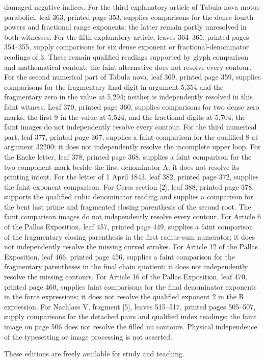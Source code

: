 damaged negative indices. For the third explanatory article of Tabula nova motus parabolici, leaf 363, printed page 353, supplies comparisons for the dense fourth powers and fractional range exponents; the latter remain partly unresolved in both witnesses. For the fifth explanatory article, leaves 364–365, printed pages 354–355, supply comparisons for six dense exponent or fractional-denominator readings of 3. These remain qualified readings supported by glyph comparison and mathematical context; the faint alternative does not resolve every contour. For the second numerical part of Tabula nova, leaf 369, printed page 359, supplies comparisons for the fragmentary final digit in argument 5,354 and the fragmentary zero in the value at 5,294; neither is independently resolved in this faint witness. Leaf 370, printed page 360, supplies comparisons for two dense zero marks, the first 9 in the value at 5,524, and the fractional digits at 5,704; the faint images do not independently resolve every contour. For the third numerical part, leaf 377, printed page 367, supplies a faint comparison for the qualified 8 at argument 32200; it does not independently resolve the incomplete upper loop. For the Encke letter, leaf 378, printed page 368, supplies a faint comparison for the two-component mark beside the first denominator A; it does not resolve its printing intent. For the letter of 1 April 1843, leaf 382, printed page 372, supplies the faint exponent comparison. For Ceres section [2], leaf 388, printed page 378, supports the qualified cubic denominator reading and supplies a comparison for the bent last prime and fragmented closing parenthesis of the second root. The faint comparison images do not independently resolve every contour. For Article 6 of the Pallas Exposition, leaf 457, printed page 449, supplies a faint comparison of the fragmentary closing parenthesis in the first radius-sum numerator; it does not independently resolve the missing curved strokes. For Article 12 of the Pallas Exposition, leaf 466, printed page 456, supplies a faint comparison for the fragmentary parentheses in the final chain quotient; it does not independently resolve the missing contours. For Article 16 of the Pallas Exposition, leaf 470, printed page 460, supplies faint comparisons for the final denominator exponents in the force expressions; it does not resolve the qualified exponent 2 in the R expression. For Nachlass V, fragment [5], leaves 515–517, printed pages 505–507, supply comparisons for the detached pairs and qualified index readings; the faint image on page 506 does not resolve the filled nu contours. Physical independence of the typesetting or image processing is not asserted.

These editions are freely available for study and teaching.

\par\clearpage\endgroup
